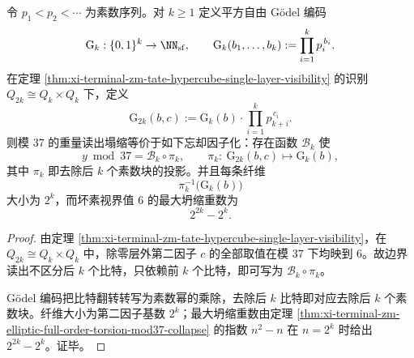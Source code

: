 \begin{proposition}\label{prop:xi-terminal-zm-godel-horizon-factorization-forgetting}
令 \(p_1<p_2<\cdots\) 为素数序列。对 \(k\ge 1\) 定义平方自由 Gödel 编码
\[
\mathrm{G}_k:\{0,1\}^k\to \NN_{\mathrm{sf}},
\qquad
\mathrm{G}_k(b_1,\dots,b_k):=\prod_{i=1}^k p_i^{\,b_i}.
\]
在定理 \ref{thm:xi-terminal-zm-tate-hypercube-single-layer-visibility} 的识别
\(
Q_{2k}\cong Q_k\times Q_k
\)
下，定义
\[
\mathrm{G}_{2k}(b,c):=\mathrm{G}_k(b)\cdot \prod_{i=1}^k p_{k+i}^{\,c_i}.
\]
则模 \(37\) 的重量读出塌缩等价于如下忘却因子化：存在函数 \(\mathcal B_k\) 使
\[
y\bmod 37=\mathcal B_k\circ \pi_k,
\qquad
\pi_k:\ \mathrm{G}_{2k}(b,c)\longmapsto \mathrm{G}_k(b),
\]
其中 \(\pi_k\) 即去除后 \(k\) 个素数块的投影。并且每条纤维
\[
\pi_k^{-1}\!\bigl(\mathrm{G}_k(b)\bigr)
\]
大小为 \(2^k\)，而坏素视界值 \(6\) 的最大坍缩重数为
\[
2^{2k}-2^k.
\]
\end{proposition}
\begin{proof}
由定理 \ref{thm:xi-terminal-zm-tate-hypercube-single-layer-visibility}，在 \(Q_{2k}\cong Q_k\times Q_k\) 中，除零层外第二因子 \(c\) 的全部取值在模 \(37\) 下均映到 \(6\)。故边界读出不区分后 \(k\) 个比特，只依赖前 \(k\) 个比特，即可写为 \(\mathcal B_k\circ\pi_k\)。

Gödel 编码把比特翻转转写为素数幂的乘除，去除后 \(k\) 比特即对应去除后 \(k\) 个素数块。纤维大小为第二因子基数 \(2^k\)；最大坍缩重数由定理 \ref{thm:xi-terminal-zm-elliptic-full-order-torsion-mod37-collapse} 的指数 \(n^2-n\) 在 \(n=2^k\) 时给出 \(2^{2k}-2^k\)。证毕。
\end{proof}


